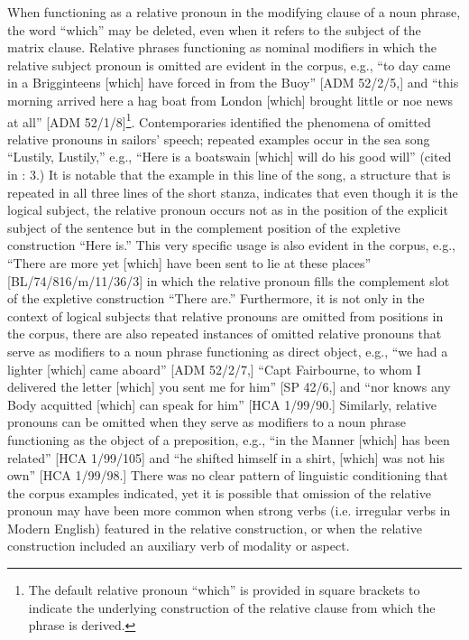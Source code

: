   When functioning as a relative pronoun in the modifying clause of a noun phrase, the word “which” may be deleted, even when it refers to the subject of the matrix clause. Relative phrases functioning as nominal modifiers in which the relative subject pronoun is omitted are evident in the corpus, e.g., “to day came in a Brigginteens [which] have forced in from the Buoy” [ADM 52/2/5,] and “this morning arrived here a hag boat from London [which] brought little or noe news at all” [ADM 52/1/8]\footnote{The default relative pronoun “which” is provided in square brackets to indicate the underlying construction of the relative clause from which the phrase is derived.}. Contemporaries identified the phenomena of omitted relative pronouns in sailors’ speech; repeated examples occur in the sea song “Lustily, Lustily,” e.g., “Here is a boatswain [which] will do his good will” (cited in \citealt{Palmer1986}: 3.) It is notable that the example in this line of the song, a structure that is repeated in all three lines of the short stanza, indicates that even though it is the logical subject, the relative pronoun occurs not as in the position of the explicit subject of the sentence but in the complement position of the expletive construction “Here is.” This very specific usage is also evident in the corpus, e.g., “There are more yet [which] have been sent to lie at these places” [BL/74/816/m/11/36/3] in which the relative pronoun fills the complement slot of the expletive construction “There are.” Furthermore, it is not only in the context of logical subjects that relative pronouns are omitted from positions in the corpus, there are also repeated instances of omitted relative pronouns that serve as modifiers to a noun phrase functioning as direct object, e.g., “we had a lighter [which] came aboard” [ADM 52/2/7,] “Capt Fairbourne, to whom I delivered the letter [which] you sent me for him” [SP 42/6,] and “nor knows any Body acquitted [which] can speak for him” [HCA 1/99/90.] Similarly, relative pronouns can be omitted when they serve as modifiers to a noun phrase functioning as the object of a preposition, e.g., “in the Manner [which] has been related” [HCA 1/99/105] and “he shifted himself in a shirt, [which] was not his own” [HCA 1/99/98.] There was no clear pattern of linguistic conditioning that the corpus examples indicated, yet it is possible that omission of the relative pronoun may have been more common when strong verbs (i.e. irregular verbs in Modern English) featured in the relative construction, or when the relative construction included an auxiliary verb of modality or aspect. 

